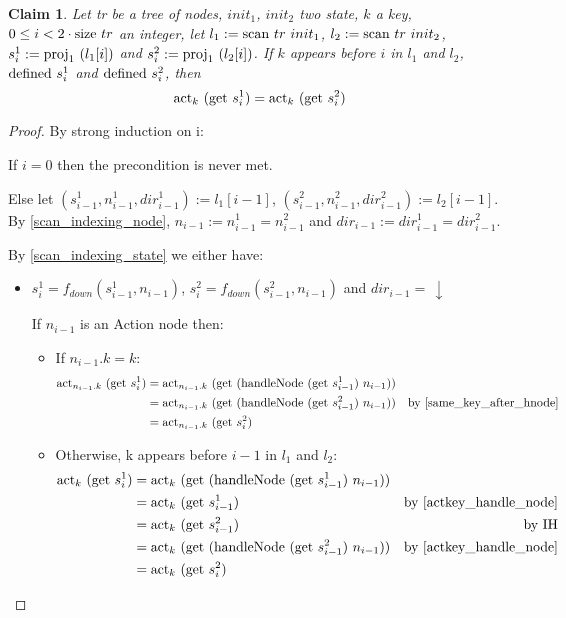 \documentclass{article}
\newtheorem{claim}[lemma]{Claim}
\newcommand{\textfun}[1]{\textup{#1}}
\newcommand{\fdown}[2]{\ensuremath{f_{down}(#1, #2)}}
\newcommand{\scan}[2]{\textfun{scan}\ #1\ #2}
\newcommand{\down}{\downarrow}
\newcommand{\hNode}[2]{\textfun{handleNode}\ #1\ #2}
\newcommand{\defined}[1]{\textfun{defined}\ #1}
\newcommand{\get}[1]{\textfun{get}\ #1}
\newcommand{\size}[1]{\textfun{size}\ #1}
\newcommand{\fst}[1]{\textfun{proj}_1\ #1}
\newcommand{\actkey}[2]{\textfun{act}_{#1}\ #2}
\begin{document}
\begin{claim}
    \label{actkey_after_appear}
    Let tr be a tree of nodes, $init_1$, $init_2$ two state, $k$ a key, $0 \leq i < 2\cdot \size{tr}$ an integer, 
    let $l_1 := \scan{tr}{init_1}$, $l_2 := \scan{tr}{init_2}$, $s^1_i := \fst{(l_1[i])}$ and $s^2_i := \fst{(l_2[i])}$. 
    If $k$ appears before $i$ in $l_1$ and $l_2$, $\defined{s^1_i}$ and $\defined{s^2_i}$, then 
    \[\actkey{k}{(\get{s^1_i})} = \actkey{k}{(\get{s^2_i})}\]
\end{claim}
\begin{proof}
    By strong induction on i:

    If $i = 0$ then the precondition is never met.

    Else let $(s^1_{i -1}, n^1_{i - 1}, dir^1_{i - 1}) := l_1[i - 1]$, $(s^2_{i -1}, n^2_{i - 1}, dir^2_{i - 1}) := l_2[i - 1]$.
    By \cref{scan_indexing_node}, $n_{i - 1} := n^1_{i - 1} = n^2_{i - 1}$ and $dir_{i - 1} := dir^1_{i - 1} = dir^2_{i - 1}$.

    By \cref{scan_indexing_state} we either have:
    \begin{itemize}
        \item $s^1_i = \fdown{s^1_{i - 1}}{n_{i - 1}}$, $s^2_i = \fdown{s^2_{i - 1}}{n_{i - 1}}$ and $dir_{i - 1} =\, \down$ 
        
            If $n_{i - 1}$ is an Action node then:
            \begin{itemize}
                \item If $n_{i - 1}.k = k$:
                \begin{align*}
                    \actkey{n_{i - 1}.k}{(\get{s^1_i})} &= \actkey{n_{i - 1}.k}{(\get{(\hNode{(\get{s^1_{i - 1}})}{n_{i - 1}})})} \\
                     &= \actkey{n_{i - 1}.k}{(\get{(\hNode{(\get{s^2_{i - 1}})}{n_{i - 1}})})} & \text{by \cref{same_key_after_hnode}}\\
                     &= \actkey{n_{i - 1}.k}{(\get{s^2_{i}})} \\
                \end{align*}
                \item Otherwise, k appears before $i - 1$ in $l_1$ and $l_2$:
                \begin{align*}
                    \actkey{k}{(\get{s^1_i})} &= \actkey{k}{(\get{(\hNode{(\get{s^1_{i - 1}})}{n_{i - 1}})})} \\
                    &= \actkey{k}{(\get{s^1_{i - 1}})} &\text{by \cref{actkey_handle_node}} \\
                    &= \actkey{k}{(\get{s^2_{i - 1}})} &\text{by IH} \\
                    &= \actkey{k}{(\get{(\hNode{(\get{s^2_{i - 1}})}{n_{i - 1}})})} &\text{by \cref{actkey_handle_node}} \\
                    &= \actkey{k}{(\get{s^2_i})}
                \end{align*}
            \end{itemize}


\end{itemize}
\end{proof}
\end{document}
